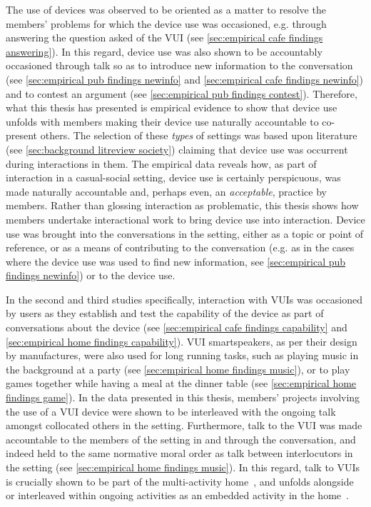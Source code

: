 \begin{revisedsubmission}
The use of devices was observed to be oriented as a matter to resolve the members' problems for which the device use was occasioned, e.g. through answering the question asked of the \ac{VUI} (see \ref{sec:empirical cafe findings answering}).
In this regard, device use was also shown to be accountably occasioned through talk so as to introduce new information to the conversation (see \ref{sec:empirical pub findings newinfo} and \ref{sec:empirical cafe findings newinfo}) and to contest an argument (see \ref{sec:empirical pub findings contest}).
Therefore, what this thesis has presented is empirical evidence to show that device use unfolds with members making their device use naturally accountable to co-present others.
The selection of these \textit{types} of settings was based upon literature (see \autoref{sec:background litreview society}) claiming that device use was occurrent during interactions in them.
The empirical data reveals how, as part of interaction in a casual-social setting, device use is certainly perspicuous, was made naturally accountable and, perhaps even, an \textit{acceptable}, practice by members.
Rather than glossing interaction as problematic, this thesis shows how members undertake interactional work to bring device use into interaction.
Device use was brought into the conversations in the setting, either as a topic or point of reference, or as a means of contributing to the conversation (e.g. as in the cases where the device use was used to find new information, see \ref{sec:empirical pub findings newinfo}) or to the device use.

In the second and third studies specifically, interaction with \acp{VUI} was occasioned by users as they establish and test the capability of the device as part of conversations about the device (see \ref{sec:empirical cafe findings capability} and \ref{sec:empirical home findings capability}).
\ac{VUI} smartspeakers, as per their design by manufactures, were also used for long running tasks, such as playing music in the background at a party (see \ref{sec:empirical home findings music}), or to play games together while having a meal at the dinner table (see \ref{sec:empirical home findings game}).
In the data presented in this thesis, members' projects involving the use of a \ac{VUI} device were shown to be interleaved with the ongoing talk amongst collocated others in the setting.
Furthermore, talk to the \ac{VUI} was made accountable to the members of the setting in and through the conversation, and indeed held to the same normative moral order as talk between interlocutors in the setting (see \ref{sec:empirical home findings music}).
In this regard, talk to \acp{VUI} is crucially shown to be part of the multi-activity home~\citep{Rooksby2015}, and unfolds alongside or interleaved within ongoing activities as an embedded activity in the home~\citep{Porcheron2018}.


\end{revisedsubmission}
